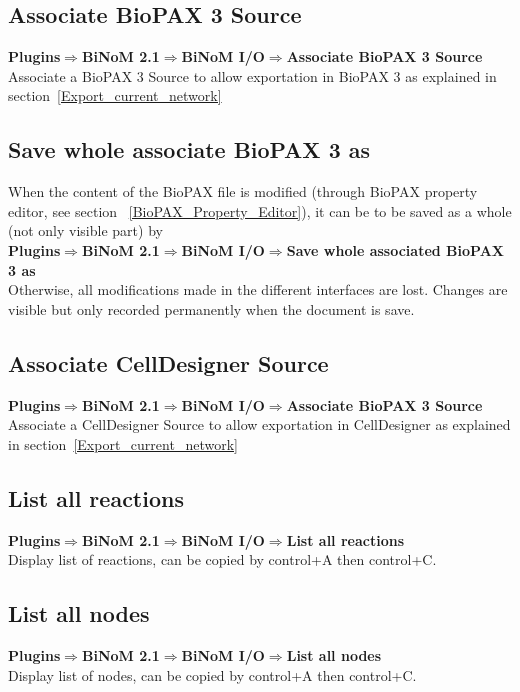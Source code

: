 \subsection{Associate BioPAX 3 Source} \label{Associate_BioPAX_Source}
\textbf{Plugins$\Rightarrow$BiNoM 2.1$\Rightarrow$BiNoM I/O$\Rightarrow$Associate BioPAX 3 Source}\\
Associate a BioPAX 3 Source to allow exportation in BioPAX 3 as explained in section~\ref{Export_current_network}

\subsection{Save whole associate BioPAX 3 as}
When the content of the BioPAX file is modified (through BioPAX property editor, see section ~\ref{BioPAX_Property_Editor}), it can be to be saved as a whole (not only visible part) by\\
\textbf{Plugins$\Rightarrow$BiNoM 2.1$\Rightarrow$BiNoM I/O$\Rightarrow$Save whole associated BioPAX 3 as}\\
Otherwise, all modifications made in the different interfaces are lost. Changes are visible but only recorded permanently when the document is save.

\subsection{Associate CellDesigner Source}\label{Associate_CellDesigner_Source}
\textbf{Plugins$\Rightarrow$BiNoM 2.1$\Rightarrow$BiNoM I/O$\Rightarrow$Associate BioPAX 3 Source} \\
Associate a CellDesigner Source to allow exportation in CellDesigner as explained in section~\ref{Export_current_network}

\subsection{List all reactions}
\textbf{Plugins$\Rightarrow$BiNoM 2.1$\Rightarrow$BiNoM I/O$\Rightarrow$List all reactions} \\
Display list of reactions, can be copied by control+A then control+C.

\subsection{List all nodes}
\textbf{Plugins$\Rightarrow$BiNoM 2.1$\Rightarrow$BiNoM I/O$\Rightarrow$List all nodes} \\
Display list of nodes, can be copied by control+A then control+C.

